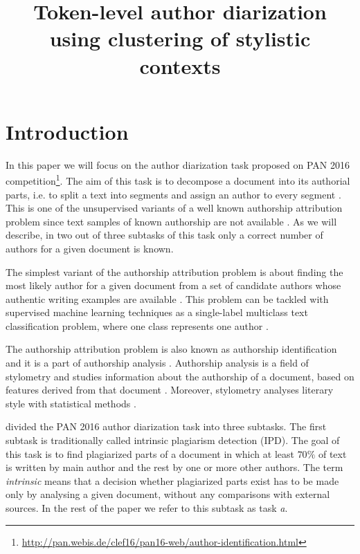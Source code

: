 \documentclass[10pt, a4paper]{article}
\title{Token-level author diarization using clustering of stylistic contexts}
\begin{document}
\maketitleabstract

\section{Introduction}
In this paper we will focus on the author diarization task proposed on PAN 2016 competition\footnote{\url{http://pan.webis.de/clef16/pan16-web/author-identification.html}}. The aim of this task is to decompose a document into its authorial parts, i.e. to split a text into segments and assign an author to every segment \citep{koppel-2011,aldebei-2015}. This is one of the unsupervised variants of a well known authorship attribution problem since text samples of known authorship are not available \citep{rosso-2016}. As we will describe, in two out of three subtasks of this task only a correct number of authors for a given document is known.

The simplest variant of the authorship attribution problem is about finding the most likely author for a given document from a set of candidate authors whose authentic writing examples are available \citep{stamatatos-2009a,stein-2011,ding-2016}. This problem can be tackled with supervised machine learning techniques as a {{{single-label}}} multiclass text classification problem, where one class represents one author \citep{stamatatos-2009a}. 

The authorship attribution problem is also known as authorship identification and it is a part of authorship analysis \citep{stamatatos-2009a,ding-2016}. Authorship analysis is a field of stylometry and studies information about the authorship of a document, based on features derived from that document \citep{layton-2013}. Moreover, stylometry analyses literary style with statistical methods  \citep{stein-2011}.	

\citet{rosso-2016} divided the PAN 2016 author diarization task into three subtasks. The first subtask is traditionally called intrinsic plagiarism detection (IPD). The goal of this task is to find plagiarized parts of a document in which at least $70\%$ of text is written by main author and the rest by one or more other authors. The term \textit{intrinsic} means that a decision whether plagiarized parts exist has to be made only by analysing a given document, without any comparisons with external sources. In the rest of the paper we refer to this subtask as task \emph{a}.
\end{document}
